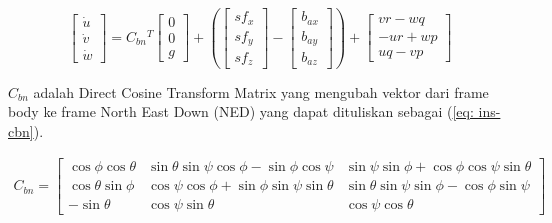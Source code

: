 \begin{frame}[allowframebreaks]
    \begin{equation}
        \left[\begin{array}{c}
        \dot{u} \\
        \dot{v} \\
        \dot{w}
        \end{array}\right]=C_{b n}{ }^{T}\left[\begin{array}{l}
        0 \\
        0 \\
        g
        \end{array}\right]+\left(\left[\begin{array}{l}
        s f_{x} \\
        s f_{y} \\
        s f_{z}
        \end{array}\right]-\left[\begin{array}{l}
        b_{a x} \\
        b_{a y} \\
        b_{a z}
        \end{array}\right]\right)+\left[\begin{array}{c}
        v r-w q \\
        -u r+w p \\
        u q-v p
        \end{array}\right]
        \label{eq: ins-speed-change}
    \end{equation}

    $C_{b n}$ adalah Direct Cosine Transform Matrix yang mengubah vektor dari frame body ke frame North East Down (NED) \cite{alam2016ins} yang dapat dituliskan sebagai (\ref{eq: ins-cbn}).

    \begin{equation}
        \begin{array}{l}
        C_{b n}
        =\left[\begin{array}{ccc}
        \cos \phi \cos \theta & \sin \theta \sin \psi \cos \phi-\sin \phi \cos \psi & \sin \psi \sin \phi+\cos \phi \cos \psi \sin \theta \\
        \cos \theta \sin \phi & \cos \psi \cos \phi+\sin \phi \sin \psi \sin \theta & \sin \theta \sin \psi \sin \phi-\cos \phi \sin \psi \\
        -\sin \theta & \cos \psi \sin \theta & \cos \psi \cos \theta
        \end{array}\right]
        \end{array}
        \label{eq: ins-cbn}
    \end{equation}


\end{frame}
